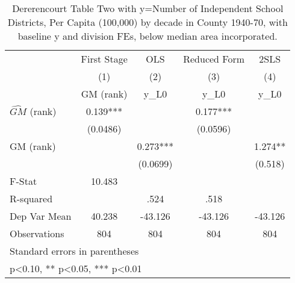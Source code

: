 \begin{table}[htbp]\centering
\def\sym#1{\ifmmode^{#1}\else\(^{#1}\)\fi}
\caption{Dererencourt Table Two with y=Number of Independent School Districts, Per Capita (100,000) by decade in County 1940-70, with baseline y and division FEs, below median area incorporated.}
\begin{tabular}{l*{4}{c}}
\toprule
                    & First Stage   &         OLS   &Reduced Form   &        2SLS   \\
                    &\multicolumn{1}{c}{(1)}&\multicolumn{1}{c}{(2)}&\multicolumn{1}{c}{(3)}&\multicolumn{1}{c}{(4)}\\
                    &\multicolumn{1}{c}{GM  (rank)}&\multicolumn{1}{c}{y\_L0}&\multicolumn{1}{c}{y\_L0}&\multicolumn{1}{c}{y\_L0}\\
\midrule
$\hat{GM}$ (rank)   &       0.139***&               &       0.177***&               \\
                    &    (0.0486)   &               &    (0.0596)   &               \\
\addlinespace
GM  (rank)          &               &       0.273***&               &       1.274** \\
                    &               &    (0.0699)   &               &     (0.518)   \\
\midrule
F-Stat              &      10.483   &               &               &               \\
R-squared           &               &        .524   &        .518   &               \\
Dep Var Mean        &      40.238   &     -43.126   &     -43.126   &     -43.126   \\
Observations        &         804   &         804   &         804   &         804   \\
\bottomrule
\multicolumn{5}{l}{\footnotesize Standard errors in parentheses}\\
\multicolumn{5}{l}{\footnotesize * p<0.10, ** p<0.05, *** p<0.01}\\
\end{tabular}
\end{table}
